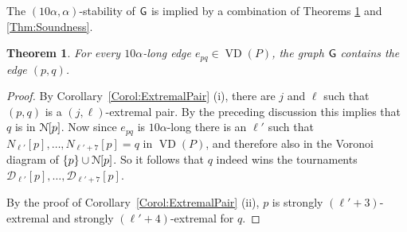\documentclass[letter,11pt]{article}
\newtheorem{theorem}{Theorem}[section]
\def\NN{\EuScript{N}}
\def\dirtour{{\mathcal D}}
\def\G{{\sf G}}
\def\VD{\mathop{\mathrm{VD}}}
\begin{document}
The $(10\alpha,\alpha)$-stability of $\G$ is implied by a combination of Theorems \ref{Thm:Completeness} and \ref{Thm:Soundness}.
\begin{theorem}\label{Thm:Completeness}
For every $10\alpha$-long edge $e_{pq}\in \VD(P)$, the graph $\G$
contains the edge $(p,q)$.
\end{theorem}
\begin{proof}
By Corollary~\ref{Corol:ExtremalPair} (i), 
there are $j$ and $\ell$ such that $(p,q)$ is a $(j,\ell)$-extremal pair.
By the preceding discussion this implies that $q$ is in $\NN[p]$.
 Now since $e_{pq}$ is  $10\alpha$-long 
  there is an $\ell'$ such that 
$N_{\ell'}[p],\ldots,N_{\ell'+7}[p]=q$ in $\VD(P)$, and therefore also
in the Voronoi diagram of $\{p\}\cup \NN[p]$.
So it follows that $q$ indeed wins the tournaments
 $\dirtour_{\ell'}[p],\ldots,\dirtour_{\ell'+7}[p]$.

By the proof of Corollary~\ref{Corol:ExtremalPair} (ii), $p$ is
strongly  $(\ell'+3)$-extremal and
strongly $(\ell'+4)$-extremal for $q$.
\end{proof}
\end{document}
